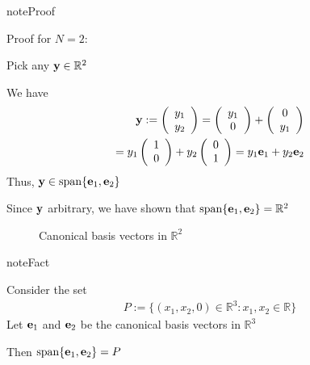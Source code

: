 \documentclass[letterpaper,10pt,english]{jupyterBook}
\begin{document}
\begin{sphinxadmonition}{note}{Proof}

\sphinxAtStartPar
Proof for \(N=2\):

\sphinxAtStartPar
Pick any \({\bf y} \in \mathbb{R}^2\)

\sphinxAtStartPar
We have
\begin{equation*}
\begin{split}
%
{\bf y} 
:=
\left(
\begin{array}{c}
y_1 \\
y_2
\end{array}
\right)
=
\left(
\begin{array}{c}
y_1 \\
0
\end{array}
\right)
+
\left(
\begin{array}{c}
0 \\
y_1
\end{array}
\right)
\\
=
y_1
\left(
\begin{array}{c}
1 \\
0
\end{array}
\right)
+
y_2
\left(
\begin{array}{c}
0 \\
1
\end{array}
\right)
= y_1 {\bf e}_1 + y_2 {\bf e}_2
%
\end{split}
\end{equation*}
\sphinxAtStartPar
Thus, \({\bf y} \in \mathrm{span} \{{\bf e}_1, {\bf e}_2\}\)

\sphinxAtStartPar
Since \({\bf y}\) arbitrary, we have shown that \(\mathrm{span} \{{\bf e}_1,
{\bf e}_2\} = \mathbb{R}^2\)
\end{sphinxadmonition}

\begin{figure}[htbp]
\centering
\capstart

\noindent{}
\caption{Canonical basis vectors in \(\mathbb{R}^2\)}\label{\detokenize{05.linear_algebra:f-vec-canon2}}\end{figure}

\begin{sphinxadmonition}{note}{Fact}

\sphinxAtStartPar
Consider the set
\begin{equation*}
\begin{split}
%
P := \{ (x_1, x_2, 0) \in \mathbb{R}^3 \colon x_1, x_2 \in \mathbb{R \}}
%
\end{split}
\end{equation*}
\sphinxAtStartPar
Let \({\bf e}_1\) and \({\bf e}_2\) be the canonical basis vectors in \(\mathbb{R}^3\)

\sphinxAtStartPar
Then
\(\mathrm{span}\{{\bf e}_1, {\bf e}_2\} = P\)
\end{sphinxadmonition}
\end{document}
